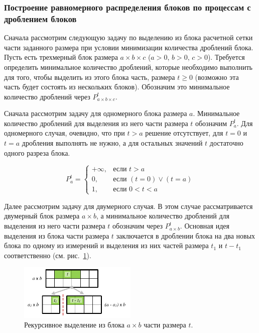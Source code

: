 \subsubsection{Построение равномерного распределения блоков по процессам с дроблением блоков}

Сначала рассмотрим следующую задачу по выделению из блока расчетной сетки части заданного размера при условии минимизации количества дроблений блока.
Пусть есть трехмерный блок размера $a \times b \times c$ ($a > 0$, $b > 0$, $c > 0$).
Требуется определить минимальное количество дроблений, которые необходимо выполнить для того, чтобы выделить из этого блока часть, размера $t \ge 0$ (возможно эта часть будет состоять из нескольких блоков).
Обозначим это минимальное количество дроблений через $P_{a \times b \times c}^t$.

Сначала рассмотрим задачу для одномерного блока размера $a$.
Минимальное количество дроблений для выделения из него части размера $t$ обозначим $P_a^t$.
Для одномерного случая, очевидно, что при $t > a$ решение отсутствует, для $t = 0$ и $t = a$ дробления выполнять не нужно, а для остальных значений $t$ достаточно одного разреза блока.

\begin{equation}\label{eqn:par_pnt_1d}
P_a^t =
	\begin{cases}
		+\infty, & \text{если } t > a \\[-8pt]
		0, & \text{если } (t = 0) \vee (t = a) \\[-8pt]
		1, & \text{если } 0 < t < a
	\end{cases}
\end{equation}

Далее рассмотрим задачу для двумерного случая.
В этом случае рассматривается двумерный блок размера $a \times b$, а минимальное количество дроблений для выделения из него части размера $t$ обозначим через $P_{a \times b}^t$.
Основная идея выделения из блока части размера $t$ заключается в дроблении блока на два новых блока по одному из измерений и выделения из них частей размера $t_1$ и $t - t_1$ соответственно (см. рис.~\ref{fig:par_pnmt_2d}).

\begin{figure}[ht]
\centering
\includegraphics[width=0.5\textwidth]{fig/par_pnmt_2d.pdf}
\singlespacing
{}\caption{Рекурсивное выделение из блока $a \times b$ части размера $t$.}
\label{fig:par_pnmt_2d}
\end{figure}

